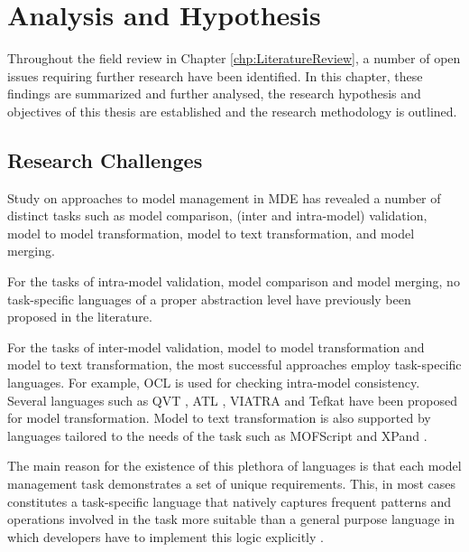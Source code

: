 \chapter{Analysis and Hypothesis}
\label{chp:Analysis}

Throughout the field review in Chapter \ref{chp:LiteratureReview}, a number of open issues requiring further research have been identified. In this chapter, these findings are summarized and further analysed, the research hypothesis and objectives of this thesis are established and the research methodology is outlined. 

\section{Research Challenges}
\label{sec:Analysis.ResearchChallenges}

Study on approaches to model management in MDE has revealed a number of distinct tasks such as model comparison, (inter and intra-model) validation, model to model transformation, model to text transformation, and model merging.

For the tasks of intra-model validation, model comparison and model merging, no task-specific languages of a proper abstraction level have previously been proposed in the literature.

For the tasks of inter-model validation, model to model transformation and model to text transformation, the most successful approaches employ task-specific languages. For example, OCL is used for checking intra-model consistency. Several languages such as QVT \cite{QVTP}, ATL \cite{ATL}, VIATRA \cite{VIATRA2} and Tefkat \cite{Tefkat} have been proposed for model transformation. Model to text transformation is also supported by languages tailored to the needs of the task such as MOFScript \cite{MOFScript} and XPand \cite{XPand}.

The main reason for the existence of this plethora of languages is that each model management task demonstrates a set of unique requirements. This, in most cases constitutes a task-specific language that natively captures frequent patterns and operations involved in the task more suitable than a general purpose language in which developers have to implement this logic explicitly \cite{EOL}.


